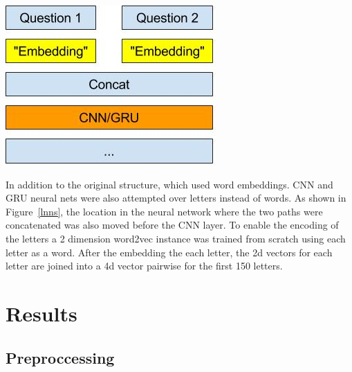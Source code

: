 \documentclass{article}
\begin{document}
\begin{center}
  \includegraphics[width=\textwidth]{LetterNeuralNetStructure}
  \label{lnns}
\end{center}

In addition to the original structure, which used word embeddings. CNN and GRU neural nets were also attempted over letters instead of words. As shown in Figure~\ref{lnns}, the location in the neural network where the two paths were concatenated was also moved before the CNN layer. To enable the encoding of the letters a 2 dimension word2vec instance was trained from scratch using each letter as a word. After the embedding the each letter, the 2d vectors for each letter are joined into a 4d vector pairwise for the first 150 letters.

\section{Results}

\subsection{Preproccessing}
\end{document}
